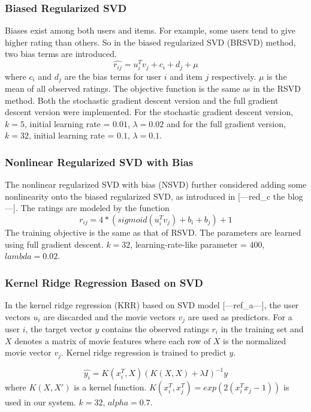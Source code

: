 \documentclass[10pt,conference,compsocconf]{IEEEtran}
\begin{document}
\subsubsection{Biased Regularized SVD}
Biases exist among both users and items. For example, some users tend to give higher rating than others. So in the biased regularized SVD (BRSVD) method, two bias terms are introduced.
$$ \hat{r_{ij}}=u_{i}^{T}v_{j} + c_i + d_j  + \mu $$
where $c_i$ and $d_j$ are the bias terms for user $i$ and item $j$ respectively. $\mu$ is the mean of all observed ratings. The objective function is the same as in the RSVD method.
Both the stochastic gradient descent version and the full gradient descent version were implemented. For the stochastic gradient descent version, $k=5$, initial learning rate = $0.01$, $\lambda=0.02$ and for the full gradient version, $k=32$, initial learning rate = $0.1$, $\lambda=0.1$.

\subsubsection{Nonlinear Regularized SVD with Bias}
The nonlinear regularized SVD with bias (NSVD) further considered adding some nonlinearity onto the biased regularized SVD, as introduced in [---red\_c the blog---]. The ratings are modeled by the function $$r_{ij}= 4*(sigmoid(u_{i}^{T}v_{j}) + b_i + b_j)+1$$
The training objective is the same as that of RSVD. The parameters are learned using full gradient descent. $k=32$, learning-rate-like parameter = $400$, $lambda = 0.02$.

\subsubsection{Kernel Ridge Regression Based on SVD}
In the kernel ridge regression (KRR) based on SVD model [---ref\_a---], the user vectors $u_i$ are discarded and the movie vectors $v_j$ are used as predictors. For a user $i$, the target vector $y$ contains the observed ratings $r_i$ in the training set and $X$ denotes a matrix of movie features where each row of $X$ is the normalized movie vector $v_j$. Kernel ridge regression is trained to predict $y$.

$$ \hat{y_i} = K(x_i^T, X)(K(X,X) + \lambda I)^{-1}y$$
where $K(X, X')$ is a kernel function. $K(x_{i}^{T}, x_{j}^{T})=exp(2(x_i^Tx_j-1))$ is used in our system. $k=32$, $alpha=0.7$.
\end{document}

